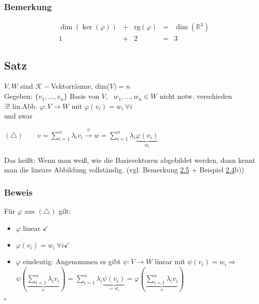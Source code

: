 \documentclass[12pt,titlepage, pdf]{article}
\newcommand{\R}{\mathds{R}}
\newcommand{\K}{\mathcal{K}}
\newcommand{\qed}{\hfill$\square$}
\renewcommand{\>}{\rightarrow}
\renewcommand{\*}{\cdot}
\renewcommand{\phi}{\varphi}
\begin{document}
\subsubsection*{Bemerkung}
\begin{align*}
	&\dim(\ker(\phi))&+&\textrm{rg}(\phi)&=&\dim(\R^3)\\
	&1&+&2&=&3
\end{align*}
\subsection{Satz}
$V,W$ sind $\K-$Vektorräume, dim($V) = n$\\
Gegeben: $\{v_1,...,v_n\}$ Basis von $V$,~ $w_1,...,w_n \in W$ nicht notw. verschieden \\
$\exists!$ lin.Abb. $\phi: V \rightarrow W$ mit $\phi(v_i) = w_i ~\forall i$\\
und zwar 
\begin{center}
	$(\triangle) \qquad v = \sum_{i = 1}^{n} \lambda_i v_i \overset{\phi}{\rightarrow} w = \sum_{i = 1}^{n} \lambda_i \underbrace{\phi(v_i)}_{w_i}$
\end{center}
Das heißt: Wenn man weiß, wie die Basisvektoren abgebildet werden, dann kennt man die lineare Abbildung vollständig. (vgl. Bemerkung \hyperref[2.5]{2.5} + Beispiel \hyperref[2.4]{2.4}b))
\subsubsection*{Beweis}
Für $\phi$ aus $(\triangle)$ gilt: 
\begin{itemize}
	\item $\phi$ linear $\checkmark$
	\item $\phi(v_i) = w_i ~\forall i \checkmark$
	\item $\phi$ eindeutig: Angenommen es gibt $\psi: V \rightarrow W$ linear mit $\psi(v_i) = w_i\Rightarrow$\\
	$\psi(\underbrace{\sum_{i = 1}^{n} \lambda_i v_i}_{v}) = \sum_{i = 1}^{n}\lambda_i \underbrace{\psi(v_i)}_{= w_i} = \phi(\underbrace{\sum_{i = 1}^{n} \lambda_i v_i}_{v})$ 
\end{itemize}
\qed
\end{document}
